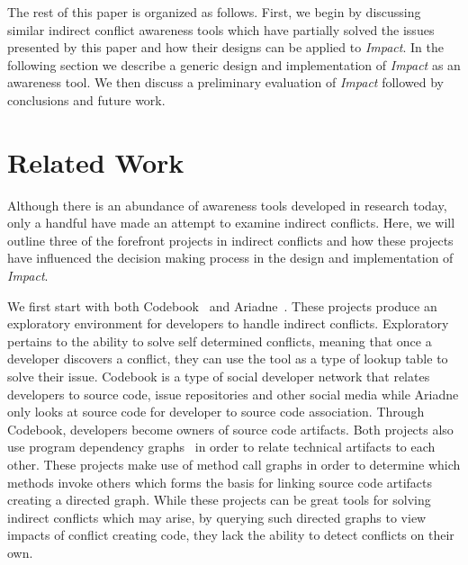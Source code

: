 \documentclass[conference]{IEEEtran}
\begin{document}
The rest of this paper is organized as follows. First, we begin by discussing
similar indirect conflict awareness tools which have partially solved the
issues presented by this paper and how their designs can be applied to 
\textit{Impact}. In the following section we describe a generic design and implementation
of \textit{Impact} as an awareness tool. We then discuss a preliminary evaluation of
\textit{Impact} followed by conclusions and future work.


\section{Related Work}
Although there is an abundance of awareness tools developed in research
today, only a handful have made an attempt to examine indirect conflicts.
Here, we will outline three of the forefront projects in indirect conflicts
and how these projects have influenced the decision making process in
the design and implementation of \textit{Impact}.

We first start with both Codebook~\cite{Begel:2010:CDE} and 
Ariadne~\cite{Trainer:2005:BGT}. These projects produce an exploratory
environment for developers to handle indirect conflicts. Exploratory
pertains to the ability to solve self determined conflicts, meaning that
once a developer discovers a conflict, they can use the tool as a type of
lookup table to solve their issue. Codebook is a type of social developer
network that relates developers to source code, issue repositories and
other social media while Ariadne only looks at source code for developer
to source code association. Through Codebook, developers become
owners of source code artifacts. Both projects also use program 
dependency graphs~\cite{Horwitz:1992:UPD}
in order to relate technical artifacts to each other. These projects make 
use of method call graphs in order to 
determine which methods invoke others which forms the basis for 
linking source code artifacts creating a directed graph. While these 
projects can be great tools 
for solving indirect conflicts which may arise, by querying such directed
graphs to view impacts of conflict creating code, they lack the ability to
detect conflicts on their own.
\end{document}
